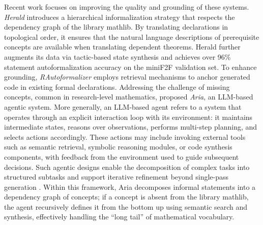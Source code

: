 \documentclass[11pt]{article}
\numberwithin{equation}{section}
\begin{document}
Recent work focuses on improving the quality and grounding of these systems. \textit{Herald} \cite{gao2025herald} introduces a hierarchical informalization strategy that respects the dependency graph of the library mathlib. By translating declarations in topological order, it ensures that the natural language descriptions of prerequisite concepts are available when translating dependent theorems. Herald further augments its data via tactic-based state synthesis and achieves over 96\% statement autoformalization accuracy on the miniF2F validation set. To enhance grounding, \textit{RAutoformalizer} \cite{liu2025rethinking} employs retrieval mechanisms to anchor generated code in existing formal declarations. Addressing the challenge of missing concepts, common in research-level mathematics, \cite{wang2025aria} proposed \textit{Aria}, an LLM-based agentic system. More generally, an LLM-based agent refers to a system that operates through an explicit interaction loop with its environment: it maintains intermediate states, reasons over observations, performs multi-step planning, and selects actions accordingly. These actions may include invoking external tools such as semantic retrieval, symbolic reasoning modules, or code synthesis components, with feedback from the environment used to guide subsequent decisions. Such agentic designs enable the decomposition of complex tasks into structured subtasks and support iterative refinement beyond single-pass generation \cite{wang2024survey}. Within this framework, Aria decomposes informal statements into a dependency graph of concepts; if a concept is absent from the library mathlib, the agent recursively defines it from the bottom up using semantic search and synthesis, effectively handling the ``long tail'' of mathematical vocabulary.
\end{document}
